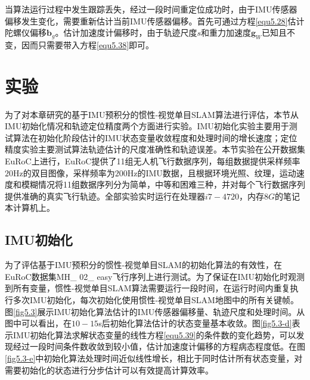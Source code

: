 当算法运行过程中发生跟踪丢失，经过一段时间重定位成功时，由于IMU传感器偏移发生变化，需要重新估计当前IMU传感器偏移。首先可通过方程\eqref{equ5.28}估计陀螺仪偏移$\boldsymbol{b}_g$。估计加速度计偏移时，由于轨迹尺度$s$和重力加速度$\boldsymbol{g}_W$已知且不变，因而只需要带入方程\eqref{equ5.38}即可。


\section{实验}
为了对本章研究的基于IMU预积分的惯性-视觉单目SLAM算法进行评估，本节从IMU初始化情况和轨迹定位精度两个方面进行实验。IMU初始化实验主要用于测试算法在初始化阶段估计的IMU状态变量收敛程度和处理时间的增长速度；定位精度实验主要测试算法轨迹估计的尺度准确性和轨迹误差。本节实验在公开数据集EuRoC\upcite{[5.4]}上进行，EuRoC提供了11组无人机飞行数据序列，每组数据提供采样频率$20$Hz的双目图像，采样频率为$200$Hz的IMU数据，且根据环境光照、纹理，运动速度和模糊情况将11组数据序列分为简单，中等和困难三种，并对每个飞行数据序列提供准确的真实飞行轨迹。全部实验实时运行在处理器$i7-4720$，内存$8G$的笔记本计算机上。

\subsection{IMU初始化}
为了评估基于IMU预积分的惯性-视觉单目SLAM的初始化算法的有效性，在EuRoC数据集MH\_ 02\_ easy飞行序列上进行测试。为了保证在IMU初始化时观测到所有变量，惯性-视觉单目SLAM算法需要运行一段时间，在运行时间内重复执行多次IMU初始化，每次初始化使用惯性-视觉单目SLAM地图中的所有关键帧。图\ref{fig5.3}展示IMU初始化算法估计的IMU传感器偏移量、轨迹尺度和处理时间。从图中可以看出，在$10-15$s后初始化算法估计的状态变量基本收敛。图\ref{fig5.3-d}表示IMU初始化算法求解状态变量的线性方程\eqref{equ5.39}的条件数的变化趋势，可以发现经过一段时间条件数收敛到较小值，估计加速度计偏移的方程病态程度低。在图\ref{fig5.3-e}中初始化算法处理时间近似线性增长，相比于同时估计所有状态变量\upcite{[5.5]}，对需要初始化的状态进行分步估计可以有效提高计算效率。

